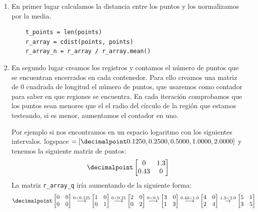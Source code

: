 \documentclass[size=a4, parskip=half, titlepage=false, toc=flat, toc=bib, 12pt]{scrartcl}
\begin{document}
\begin{enumerate}
\item En primer lugar calculamos la distancia entre los puntos y los normalizamos por la media.

\begin{verbatim}
    t_points = len(points)
    r_array = cdist(points, points)
    r_array_n = r_array / r_array.mean()
\end{verbatim}

\item En segundo lugar creamos los registros y contamos el número de puntos que se encuentran encerrados en cada contenedor. Para ello creamos una matriz de 0 cuadrada de longitud el número de puntos, que usaremos como contador para saber en que regiones se encuentra. En cada iteración comprobamos que los puntos sean menores que el el radio del círculo de la región que estamos testeando, si es menor, aumentamos el contador en uno.

Por ejemplo si nos encontramos en un espacio logaritmo con los siguientes intervalos.
logspace $= [\decimalpoint 0.1250, 0.2500, 0.5000, 1.0000, 2.0000]$ y tenemos la siguiente matriz de puntos:
$$\decimalpoint \begin{bmatrix}
0 & 1.3 \\
0.43 & 0
\end{bmatrix}$$
La matriz \verb|r_array_q| iría aumentando de la siguiente forma:
$$\decimalpoint \begin{bmatrix}
0 & 0 \\
0 & 0
\end{bmatrix} \stackrel{0 < 0.125}{\longrightarrow} \begin{bmatrix}
1 & 0 \\
0 & 1
\end{bmatrix} \stackrel{0 < 0.25}{\longrightarrow} \begin{bmatrix}
2 & 0 \\
0 & 2
\end{bmatrix} \stackrel{0 < 0.5}{\longrightarrow} \begin{bmatrix}
3 & 0 \\
1 & 3
\end{bmatrix} \stackrel{0.43 < 1.0}{\longrightarrow} \begin{bmatrix}
4 & 0 \\
2 & 4
\end{bmatrix} \stackrel{1.3 < 2.0}\rightarrow \begin{bmatrix}
5 & 1 \\
3 & 5
\end{bmatrix}$$


\end{enumerate}
\end{document}
